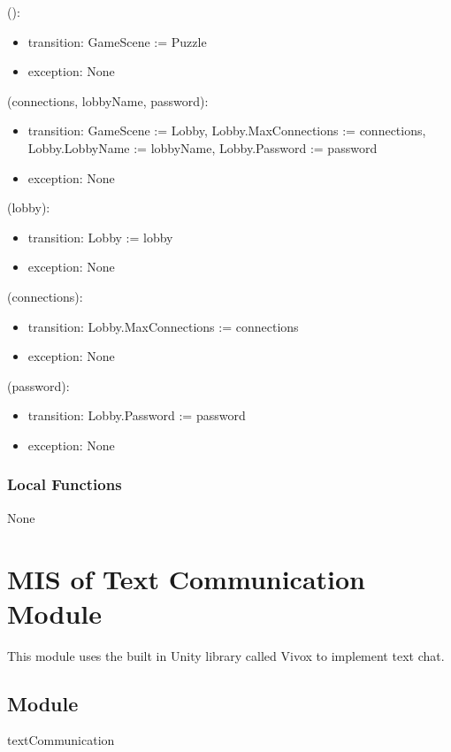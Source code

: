 \documentclass[12pt, titlepage]{article}
\begin{document}
():
\begin{itemize}
\item transition: GameScene := Puzzle
\item exception: None
\end{itemize}

(connections, lobbyName, password):
\begin{itemize}
\item transition: GameScene := Lobby, Lobby.MaxConnections := connections, Lobby.LobbyName := lobbyName, Lobby.Password := password
\item exception: None
\end{itemize}

(lobby):
\begin{itemize}
\item transition: Lobby := lobby
\item exception: None
\end{itemize}

(connections):
\begin{itemize}
\item transition: Lobby.MaxConnections := connections
\item exception: None
\end{itemize}

(password):
\begin{itemize}
\item transition: Lobby.Password := password
\item exception: None 
\end{itemize}

\subsubsection{Local Functions}

None

\newpage

\section{MIS of Text Communication Module} \label{text} 

  This module uses the built in Unity library called Vivox to implement text chat.


\subsection{Module}
textCommunication
\end{document}
